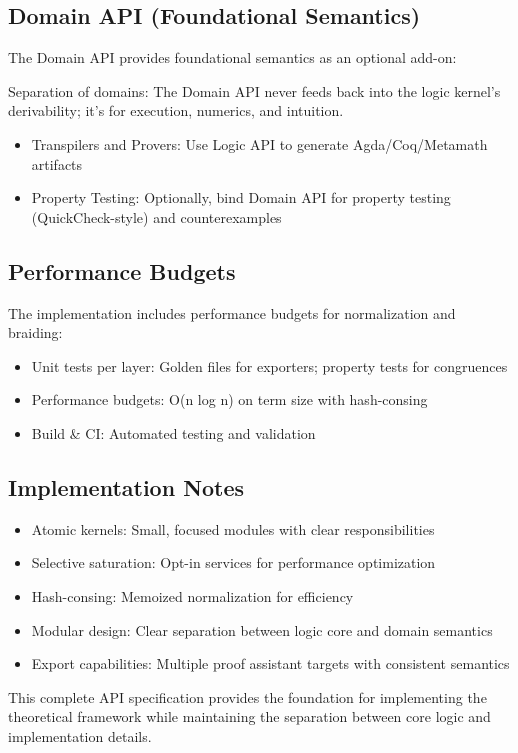\subsection{Domain API (Foundational Semantics)}

The Domain API provides foundational semantics as an optional add-on:

Separation of domains: The Domain API never feeds back into the logic kernel's derivability; it's for execution, numerics, and intuition.

\begin{itemize}
\item Transpilers and Provers: Use Logic API to generate Agda/Coq/Metamath artifacts
\item Property Testing: Optionally, bind Domain API for property testing (QuickCheck-style) and counterexamples
\end{itemize}

\subsection{Performance Budgets}

The implementation includes performance budgets for normalization and braiding:

\begin{itemize}
\item Unit tests per layer: Golden files for exporters; property tests for congruences
\item Performance budgets: O(n log n) on term size with hash-consing
\item Build \& CI: Automated testing and validation
\end{itemize}

\subsection{Implementation Notes}

\begin{itemize}
\item Atomic kernels: Small, focused modules with clear responsibilities
\item Selective saturation: Opt-in services for performance optimization
\item Hash-consing: Memoized normalization for efficiency
\item Modular design: Clear separation between logic core and domain semantics
\item Export capabilities: Multiple proof assistant targets with consistent semantics
\end{itemize}

This complete API specification provides the foundation for implementing the theoretical framework while maintaining the separation between core logic and implementation details.
